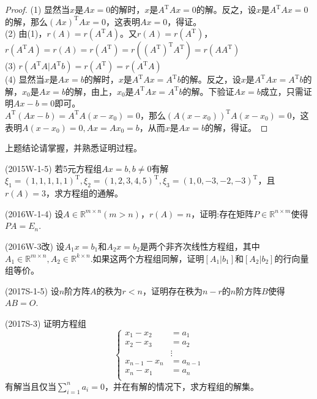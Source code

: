 \documentclass[lang=cn,newtx,10pt,scheme=chinese]{elegantbook}
\begin{document}
\begin{proof}
    (1) 显然当$x$是$Ax=0$的解时，$x$是$A^\mathrm{T} A x = 0$的解。反之，设$x$是$A^\mathrm{T} A x = 0$的解，那么$(A x)^\mathrm{T} A x = 0$，这表明$A x = 0$，得证。\\
    (2) 由(1)，$r(A) = r(A^\mathrm{T} A)$。又$r(A) = r(A^\mathrm{T})$，$r(A^\mathrm{T} A) = r(A) = r(A^\mathrm{T}) = r((A^\mathrm{T})^\mathrm{T} A^\mathrm{T}) = r(A A^\mathrm{T})$ \\
    (3) $r(A^\mathrm{T} A | A^\mathrm{T} b) = r(A^\mathrm{T}) = r(A^\mathrm{T} A)$ \\
    (4) 显然当$x$是$Ax=b$的解时，$x$是$A^\mathrm{T} A x = A^\mathrm{T} b$的解。反之，设$x$是$A^\mathrm{T} A x = A^\mathrm{T} b$的解，$x_0$是$Ax=b$的解，由上，$x_0$是$A^\mathrm{T} A x = A^\mathrm{T} b$的解。下验证$Ax = b$成立，只需证明$Ax - b = 0$即可。\\
    $A^\mathrm{T} (Ax - b) = A^\mathrm{T} A(x - x_0) = 0$，那么$(A(x - x_0))^\mathrm{T} A(x - x_0) = 0$，这表明$A(x - x_0) = 0,Ax = Ax_0 = b$，从而$x$是$Ax=b$的解，得证。
\end{proof}

\begin{remark}
    上题结论请掌握，并熟悉证明过程。
\end{remark}

\begin{exercise}
    (2015W-1-5) 若5元方程组$Ax=b,b \neq 0$有解$\xi_1=(1,1,1,1,1)^\mathrm{T},\xi_2=(1,2,3,4,5)^\mathrm{T},\xi_3=(1,0,-3,-2,-3)^\mathrm{T}$，且$r(A)=3$，求方程组的通解。
\end{exercise}

\begin{exercise}
    (2016W-1-4) 设$A \in \mathbb{R}^{m \times n} (m>n)$，$r(A)=n$，证明:存在矩阵$P \in \mathbb{R}^{n \times m}$使得$PA = E_n$.
\end{exercise}

\begin{exercise}
    (2016W-3改) 设$A_1 x = b_1$和$A_2 x = b_2$是两个非齐次线性方程组，其中$A_1 \in \mathbb{R}^{m \times n}, A_2 \in \mathbb{R}^{k \times n}$.如果这两个方程组同解，证明$[A_1 | b_1]$和$[A_2 | b_2]$的行向量组等价。
\end{exercise}

\begin{exercise}
    (2017S-1-5) 设$n$阶方阵$A$的秩为$r<n$，证明存在秩为$n-r$的$n$阶方阵$B$使得$AB=O$.
\end{exercise}

\begin{exercise}
    (2017S-3) 证明方程组
    $$
    \begin{cases}
        x_1 - x_2 &= a_1 \\
        x_2 - x_3 &= a_2 \\
        &\vdots \\
        x_{n-1} - x_n &= a_{n-1} \\
        x_n - x_1 &= a_n \\
    \end{cases}
    $$
    有解当且仅当$\sum_{i=1}^n a_i = 0$，并在有解的情况下，求方程组的解集。
\end{exercise}
\end{document}
